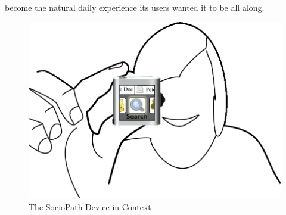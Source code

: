 become the natural daily experience its users wanted it to be all along.
\begin{figure}[h]
  \begin{center}
    \includegraphics[width=0.8\linewidth]{imgs/main.png}
  \end{center}
  \caption{The SocioPath Device in Context}
  \label{fig:main}
\end{figure}
